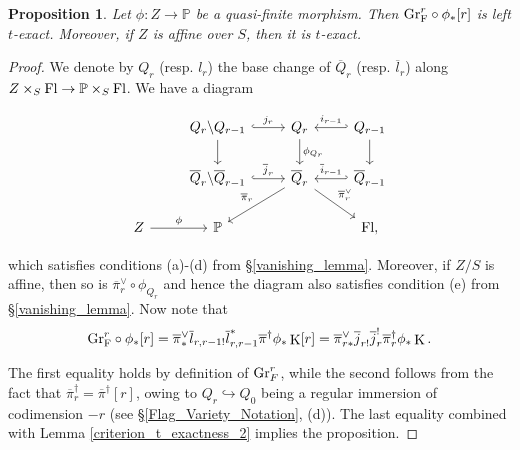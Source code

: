 \documentclass[12pt, reqno]{amsart}
\theoremstyle{plain}
\newtheorem{prop}[thm]{\bf Proposition}
\theoremstyle{definition}
\theoremstyle{definition}
\newcommand{\bbP}{{\mathbb P}}
\DeclareMathOperator{\KK}{K}
\begin{document}
\begin{prop}\label{flag_t_exactness}
    Let $\phi \colon Z \to \bbP$ be a quasi-finite morphism. Then $\textup{Gr}^{r}_{\textup{F}}\circ \phi_{*}[r]$ is left $t$-exact. Moreover, if $Z$ is affine over $S$, then it is $t$-exact.
\end{prop}

\begin{proof}
    
    We denote by $Q_{r}$ (resp. $l_{r}$) the base change of $\overline{Q}_{r}$ (resp. $\overline{l}_{r}$) along $Z \times_S \textup{Fl} \to \bbP \times_S \textup{Fl}$. We have a diagram

    \begin{equation}\label{flag_t_exactness_diagram}
  \begin{tikzcd}[row sep=normal, column sep=normal]
      & Q_{r} \backslash Q_{r-1}  \arrow[r, hook, "j_{r}"] \arrow[d] & Q_{r} \arrow[d,"\phi_{Q_{r}}"] & Q_{r-1} \arrow[l, hook', "i_{r-1}"'] \arrow[d]\\
      & \overline{Q}_{r} \backslash \overline{Q}_{r-1} \arrow[r, hook, "\overline{j}_{r}"] & \overline{Q}_{r} \arrow[dr,"\overline{\pi}_{r}^{\vee}"] \arrow[dl,"\overline{\pi}_{r}"'] & \overline{Q}_{r-1} \arrow[l, hook', "\overline{i}_{r-1}"'] \\
      Z \arrow[r,"\phi"] & \bbP & & \textup{Fl},
  \end{tikzcd}
\end{equation}


which satisfies conditions (a)-(d) from \S \ref{vanishing_lemma}. Moreover, if $Z/S$ is affine, then so is $\overline{\pi}^{\vee}_{r} \circ \phi_{Q_{r}}$ and hence the diagram also satisfies condition (e) from \S \ref{vanishing_lemma}. Now note that 
\begin{equation}\label{flag_t_exactness_iso}
\textup{Gr}^{r}_{\textup{F}}\circ \phi_{*}[r]=\overline{\pi}^{\vee}_{*}\overline{l}_{r,r-1!}\overline{l}_{r,r-1}^{*}\overline{\pi}^{\dagger}\phi_{*}\KK[r]=\overline{\pi}_{r*}^{\vee}\overline{j}_{r!}\overline{j}_{r}^{!}\overline{\pi}_{r}^{\dagger}\phi_{*}\KK.
\end{equation}


The first equality holds by definition of $\textup{Gr}^r_F$, while the second follows from the fact that $\overline{\pi}_{r}^{\dagger}=\overline{\pi}^{\dagger}[r]$, owing to $Q_{r} \hookrightarrow Q_{0}$ being a regular immersion of codimension $-r$ (see \S \ref{Flag_Variety_Notation}, (d)). The last equality combined with Lemma \ref{criterion_t_exactness_2} implies the proposition. 



\end{proof}
\end{document}
